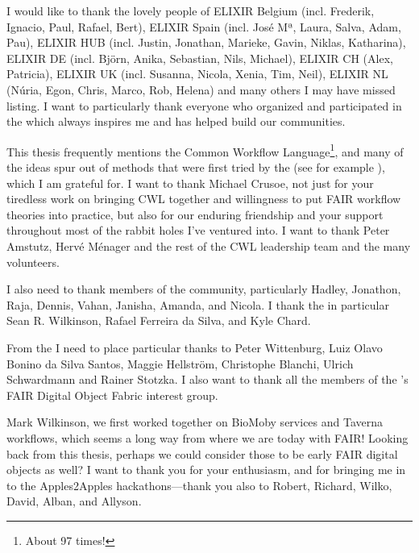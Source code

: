 I would like to thank the lovely people of ELIXIR Belgium (incl. Frederik, Ignacio, Paul, Rafael, Bert), ELIXIR Spain (incl. José Mª, Laura, Salva, Adam, Pau), ELIXIR HUB (incl. Justin, Jonathan, Marieke, Gavin, Niklas, Katharina), ELIXIR DE (incl. Björn, Anika, Sebastian, Nils, Michael), ELIXIR CH (Alex, Patricia), ELIXIR UK (incl. Susanna, Nicola, Xenia, Tim, Neil), ELIXIR NL (Núria, Egon, Chris, Marco, Rob, Helena) and many others I may have missed listing. I want to particularly thank everyone who organized and participated in the  which always inspires me and has helped build our communities.

This thesis frequently mentions the Common Workflow Language\footnote{About 97 times!}, and many of the ideas spur out of methods that were first tried by the  (see for example \cite{Möller 2017,Robinson 2017,Khan 2019,Crusoe 2022}), which I am grateful for. I want to thank Michael Crusoe, not just for your tiredless work on bringing CWL together and willingness to put FAIR workflow theories into practice, but also for our enduring friendship and your support throughout most of the rabbit holes I've ventured into. I want to thank Peter Amstutz, 
Hervé Ménager and the rest of the CWL leadership team and the many volunteers.

I also need to thank members of the  community, particularly Hadley, Jonathon, Raja, Dennis, Vahan, Janisha, Amanda, and Nicola. 
I thank the  in particular Sean R. Wilkinson, Rafael Ferreira da Silva, and Kyle Chard. 

From the  I need to place particular thanks to Peter Wittenburg, Luiz Olavo Bonino da Silva Santos, Maggie Hellström, Christophe Blanchi, Ulrich Schwardmann and Rainer Stotzka. I also want to thank all the members of the 's FAIR Digital Object Fabric interest group.

Mark Wilkinson, we first worked together on BioMoby services and Taverna workflows, which seems a long way from where we are today with FAIR! Looking back from this thesis, perhaps we could consider those to be early FAIR digital objects as well? I want to thank you for your enthusiasm,  and for bringing me in to the Apples2Apples hackathons---thank you also to Robert, Richard, Wilko, David, Alban, and Allyson.


